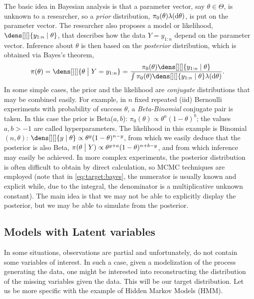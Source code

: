 \documentclass[english,graybox,envcountchap,envcountsame,sectrefs,shortlabels]{svmono}
\theoremstyle{style}
\begin{document}
The basic idea in Bayesian analysis is that a parameter vector,
say $ \theta \in \Theta$, is unknown to a researcher, so a \emph{prior} distribution,
$\pi_0( \theta)\lambda(\mathrm{d} \theta)$, is put on the parameter vector.  The researcher also
proposes a model or likelihood, $\dens[][]{ y_{1:n} \mid \theta}$, that describes
how the data $Y=y_{1:n}$ depend on the parameter vector.
Inference about $ \theta$ is then based on the \emph{posterior}
distribution, which is obtained via Bayes's theorem,
\begin{equation} \label{eq:target:bayes}
\pi(\theta)=\dens[][]{\theta \bigm| Y=y_{1:n}}=\frac{\pi_0( \theta) \dens[][]{ y_{1:n} \mid \theta}}{\int \pi_0( \theta) \dens[][]{ y_{1:n} \mid \theta} \lambda(\rmd \theta)}.
\end{equation}
  In some simple cases, the prior  and
the likelihood are \emph{conjugate}  distributions that may be combined easily.
For example, in $n$ fixed repeated (iid) Bernoulli experiments with probability of success $\theta$,
a \emph{Beta-Binomial} conjugate pair is taken.  In this case the prior is
Beta($a,b$):
$\pi_0(\theta) \propto \theta^{a} (1-\theta)^{b}$; the values $a,b > -1$  are called
hyperparameters. The likelihood in this example is
Binomial$(n,\theta)$:
$\dens[][]{ y \mid \theta} \propto \theta^y (1-\theta)^{n-y}$, from which
we easily deduce that the
posterior is also Beta,
$\pi ( \theta \bigm| Y ) \propto \theta^{y+a}(1-\theta)^{n+b-y }
$, and from which inference may easily be achieved.
In more complex experiments, the posterior distribution is often difficult to obtain by direct calculation,
so MCMC techniques are employed (note that in \eqref{eq:target:bayes}, the numerator is usually known and explicit while, due to the integral, the denominator is a multiplicative unknown constant).  The main idea is that we may not be able to
explicitly display the posterior, but we may be able to simulate from
the posterior.


\subsection{Models with Latent variables}
In some situations, observations are partial and unfortunately, do not contain some variables of interest. In such a case, given a modelization of the process generating the data, one might be interested into reconstructing the distribution of the missing variables given the data. This will be our target distribution. Let us be more specific with the example of Hidden Markov Models (HMM).
 
\end{document}
